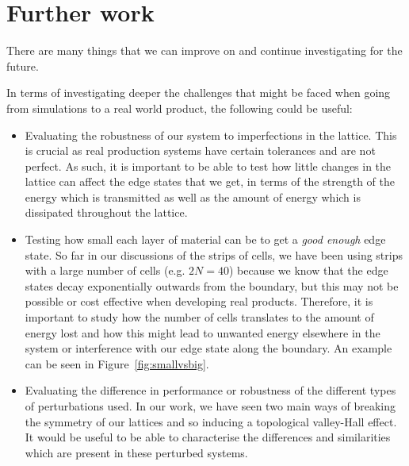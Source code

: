 \section{Further work}
There are many things that we can improve on and continue investigating for the
future. 

In terms of investigating deeper the challenges that might be faced when going
from simulations to a real world product, the following could be useful:
\begin{itemize}
\item Evaluating the robustness of our system to imperfections in the lattice.
This is crucial as real production systems have certain tolerances and are not
perfect. As such, it is important to be able to test how little changes in the
lattice can affect the edge states that we get, in terms of the strength of the
energy which is transmitted as well as the amount of energy which is dissipated
throughout the lattice.

\item Testing how small each layer of material can be to get a \textit{good
enough} edge state. So far in our discussions of the strips of cells, we have
been using strips with a large number of cells (e.g. $2N=40$) because we know
that the edge states decay exponentially outwards from the boundary, but this
may not be possible or cost effective when developing real products. Therefore,
it is important to study how the number of cells translates to the amount of
energy lost and how this might lead to unwanted energy elsewhere in the system
or interference with our edge state along the boundary. An example can be seen
in Figure~\ref{fig:smallvsbig}.

\item Evaluating the difference in performance or robustness of the different
types of perturbations used. In our work, we have seen two main ways of
breaking the symmetry of our lattices and so inducing a topological valley-Hall
effect. It would be useful to be able to characterise the differences and
similarities which are present in these perturbed systems.
\end{itemize}

